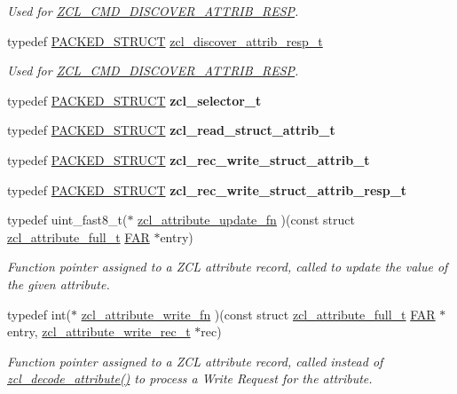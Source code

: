 \begin{DoxyCompactItemize}
\begin{DoxyCompactList}\small\item\em Used for \hyperlink{group__zcl_gae15c30229c1d8a8cdee1bd92b2cc6a15}{Z\-C\-L\-\_\-\-C\-M\-D\-\_\-\-D\-I\-S\-C\-O\-V\-E\-R\-\_\-\-A\-T\-T\-R\-I\-B\-\_\-\-R\-E\-S\-P}. \end{DoxyCompactList}\item 
typedef \hyperlink{group___s_x_a_ga4233297bd31be5c273d4fb0758cc54d7}{P\-A\-C\-K\-E\-D\-\_\-\-S\-T\-R\-U\-C\-T} \hyperlink{group__zcl_ga6e35b82b4bc8167f8d45d7d514e3cfda}{zcl\-\_\-discover\-\_\-attrib\-\_\-resp\-\_\-t}
\begin{DoxyCompactList}\small\item\em Used for \hyperlink{group__zcl_gae15c30229c1d8a8cdee1bd92b2cc6a15}{Z\-C\-L\-\_\-\-C\-M\-D\-\_\-\-D\-I\-S\-C\-O\-V\-E\-R\-\_\-\-A\-T\-T\-R\-I\-B\-\_\-\-R\-E\-S\-P}. \end{DoxyCompactList}\item 
typedef \hyperlink{group___s_x_a_ga4233297bd31be5c273d4fb0758cc54d7}{P\-A\-C\-K\-E\-D\-\_\-\-S\-T\-R\-U\-C\-T} {\bfseries zcl\-\_\-selector\-\_\-t}
\item 
typedef \hyperlink{group___s_x_a_ga4233297bd31be5c273d4fb0758cc54d7}{P\-A\-C\-K\-E\-D\-\_\-\-S\-T\-R\-U\-C\-T} {\bfseries zcl\-\_\-read\-\_\-struct\-\_\-attrib\-\_\-t}
\item 
typedef \hyperlink{group___s_x_a_ga4233297bd31be5c273d4fb0758cc54d7}{P\-A\-C\-K\-E\-D\-\_\-\-S\-T\-R\-U\-C\-T} {\bfseries zcl\-\_\-rec\-\_\-write\-\_\-struct\-\_\-attrib\-\_\-t}
\item 
typedef \hyperlink{group___s_x_a_ga4233297bd31be5c273d4fb0758cc54d7}{P\-A\-C\-K\-E\-D\-\_\-\-S\-T\-R\-U\-C\-T} {\bfseries zcl\-\_\-rec\-\_\-write\-\_\-struct\-\_\-attrib\-\_\-resp\-\_\-t}
\item 
typedef uint\-\_\-fast8\-\_\-t($\ast$ \hyperlink{group__zcl_ga9a022bce8add8364fde3ab5cc75354ef}{zcl\-\_\-attribute\-\_\-update\-\_\-fn} )(const struct \hyperlink{structzcl__attribute__full__t}{zcl\-\_\-attribute\-\_\-full\-\_\-t} \hyperlink{group__hal_gaef060b3456fdcc093a7210a762d5f2ed}{F\-A\-R} $\ast$entry)
\begin{DoxyCompactList}\small\item\em Function pointer assigned to a Z\-C\-L attribute record, called to update the value of the given attribute. \end{DoxyCompactList}\item 
typedef int($\ast$ \hyperlink{group__zcl_ga9024d6fb96d7fa35d13f7531efe3d6fb}{zcl\-\_\-attribute\-\_\-write\-\_\-fn} )(const struct \hyperlink{structzcl__attribute__full__t}{zcl\-\_\-attribute\-\_\-full\-\_\-t} \hyperlink{group__hal_gaef060b3456fdcc093a7210a762d5f2ed}{F\-A\-R} $\ast$entry, \hyperlink{structzcl__attribute__write__rec__t}{zcl\-\_\-attribute\-\_\-write\-\_\-rec\-\_\-t} $\ast$rec)
\begin{DoxyCompactList}\small\item\em Function pointer assigned to a Z\-C\-L attribute record, called instead of \hyperlink{group__zcl_ga15bf36dadccd7a045bad7d6f0842e25a}{zcl\-\_\-decode\-\_\-attribute()} to process a Write Request for the attribute. \end{DoxyCompactList}\end{DoxyCompactItemize}
